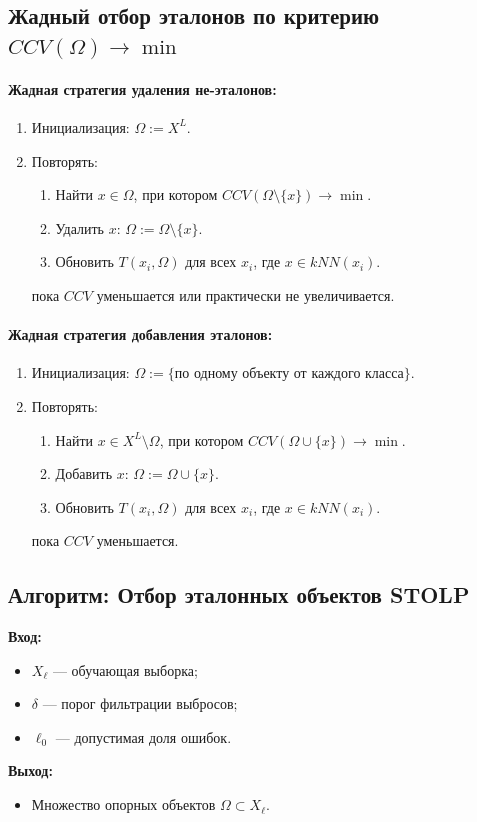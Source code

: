 \subsection*{Жадный отбор эталонов по критерию $CCV(\Omega) \to \min$}

\paragraph{Жадная стратегия удаления не-эталонов:}
\begin{enumerate}
    \item Инициализация: $\Omega := X^L$.
    \item Повторять:
    \begin{enumerate}
        \item Найти $x \in \Omega$, при котором $CCV(\Omega \setminus \{x\}) \to \min$.
        \item Удалить $x$: $\Omega := \Omega \setminus \{x\}$.
        \item Обновить $T(x_i, \Omega)$ для всех $x_i$, где $x \in kNN(x_i)$.
    \end{enumerate}
    пока $CCV$ уменьшается или практически не увеличивается.
\end{enumerate}

\paragraph{Жадная стратегия добавления эталонов:}
\begin{enumerate}
    \item Инициализация: $\Omega := \{\text{по одному объекту от каждого класса}\}$.
    \item Повторять:
    \begin{enumerate}
        \item Найти $x \in X^L \setminus \Omega$, при котором $CCV(\Omega \cup \{x\}) \to \min$.
        \item Добавить $x$: $\Omega := \Omega \cup \{x\}$.
        \item Обновить $T(x_i, \Omega)$ для всех $x_i$, где $x \in kNN(x_i)$.
    \end{enumerate}
    пока $CCV$ уменьшается.
\end{enumerate}

\subsection*{Алгоритм: Отбор эталонных объектов STOLP}
\textbf{Вход:} 
\begin{itemize}
    \item \( X_\ell \) — обучающая выборка;
    \item \( \delta \) — порог фильтрации выбросов;
    \item \( \ell_0 \) — допустимая доля ошибок.
\end{itemize}
\textbf{Выход:}
\begin{itemize}
    \item Множество опорных объектов \( \Omega \subset X_\ell \).
\end{itemize}


